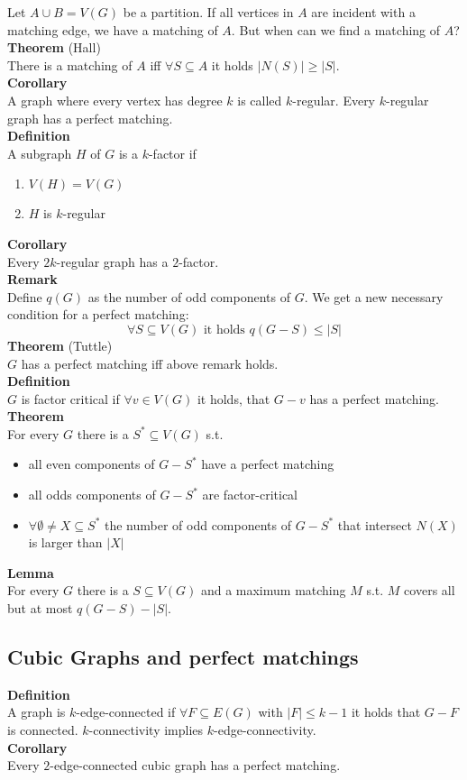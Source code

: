 \documentclass[a4paper, 12pt]{article}
\begin{document}
	Let $A\cup B = V(G)$ be a partition. If all vertices in $A$ are incident with a matching edge, we have a matching of $A$. But when can we find a matching of $A$? \\
	\textbf{Theorem} (Hall)\\
	There is a matching of $A$ iff $\forall S \subseteq A$ it holds $\left|N(S)\right| \geq \left|S\right|$.\\
	\textbf{Corollary}\\
	A graph where every vertex has degree $k$ is called $k$-regular. Every $k$-regular graph has a perfect matching.\\
	\textbf{Definition}\\
	A subgraph $H$ of $G$ is a $k$-factor if \begin{enumerate}
		\item $V(H) = V(G)$
		\item $H$ is $k$-regular 
	\end{enumerate} 
	\textbf{Corollary}\\
	Every $2k$-regular graph has a $2$-factor.\\
	\textbf{Remark}\\
	Define $q(G)$ as the number of odd components of $G$. We get a new necessary condition for a perfect matching: \[\forall S \subseteq V(G) \text{ it holds } q(G-S) \leq \left|S\right|\]
	\textbf{Theorem} (Tuttle)\\
	$G$ has a perfect matching iff above remark holds.\\
	\textbf{Definition}\\
	$G$ is factor critical if $\forall v \in V(G)$ it holds, that $G-v$ has a perfect matching.\\
	\textbf{Theorem}\\
	For every $G$ there is a $S^* \subseteq V(G)$ s.t. \begin{itemize}
		\item all even components of $G-S^*$ have a perfect matching
		\item all odds components of $G-S^*$ are factor-critical
		\item $\forall \emptyset \neq X \subseteq S^*$ the number of odd components of $G-S^*$ that intersect $N(X)$ is larger than $\left|X\right|$
	\end{itemize}
	\textbf{Lemma}\\
	For every $G$ there is a $S \subseteq V(G)$ and a maximum matching $M$ s.t. $M$ covers all but at most $q(G-S) - \left|S\right|$.
	\subsection{Cubic Graphs and perfect matchings}
	\textbf{Definition}\\
	A graph is $k$-edge-connected if $\forall F \subseteq E(G)$ with $\left|F\right| \leq k-1$ it holds that $G-F$ is connected. $k$-connectivity implies $k$-edge-connectivity.\\
	\textbf{Corollary}\\
	Every $2$-edge-connected cubic graph has a perfect matching.
\end{document}
